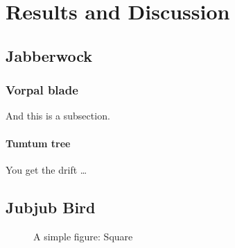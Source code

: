 %

\chapter{Results and Discussion}
\section{Jabberwock}
\subsection{Vorpal blade}
And this is a subsection.
	
\subsubsection{Tumtum tree}
You get the drift \ldots
		
\section{Jubjub Bird}

\begin{figure}[htbp]			%
\begin{center}
\caption{A simple figure: Square}	%
\label{circle}
\end{center}
\end{figure}

